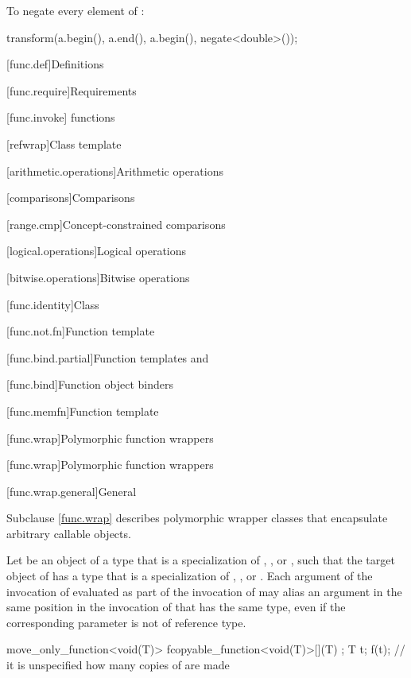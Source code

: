 \pnum
\begin{example}
To negate every element of :

\begin{codeblock}
transform(a.begin(), a.end(), a.begin(), negate<double>());
\end{codeblock}

\end{example}

[func.def]{Definitions}

[func.require]{Requirements}

[func.invoke]{ functions}

[refwrap]{Class template }

[arithmetic.operations]{Arithmetic operations}

[comparisons]{Comparisons}

[range.cmp]{Concept-constrained comparisons}

[logical.operations]{Logical operations}

[bitwise.operations]{Bitwise operations}

[func.identity]{Class }

[func.not.fn]{Function template }

[func.bind.partial]{Function templates  and }

[func.bind]{Function object binders}%

[func.memfn]{Function template }%

[func.wrap]{Polymorphic function wrappers}%

[func.wrap]{Polymorphic function wrappers}%

[func.wrap.general]{General}%

\pnum
Subclause \ref{func.wrap} describes polymorphic wrapper classes that
encapsulate arbitrary callable objects.

\pnum
Let  be an object of a type that is a specialization of
, , or ,
such that the target object  of  has a type that
is a specialization of
, , or .
Each argument of the
invocation of  evaluated as part of the invocation of 
may alias an argument in the same position in the invocation of  that
has the same type, even if the corresponding parameter is not of reference type.
\begin{example}
\begin{codeblock}
move_only_function<void(T)>
  f{copyable_function<void(T)>{[](T) {}}};
T t;
f(t);                               // it is unspecified how many copies of  are made
\end{codeblock}
\end{example}

